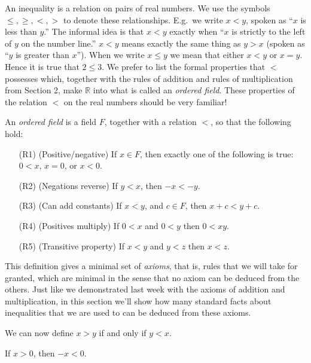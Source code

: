 \documentclass[11pt,dvipsnames]{book}
\numberwithin{figure}{section} %
\numberwithin{table}{section} %
\begin{document}
An inequality is a relation on pairs of real numbers.
We use the symbols $\leq,\geq,<,>$ to denote these relationships.
E.g.~we write $x < y$, spoken as ``$x$ is less than $y$.''
The informal idea is that $x<y$ exactly when ``$x$ is strictly to the left of $y$ on the number line.''
$x < y$ means exactly the same thing as $y > x$ (spoken as ``$y$ is greater than $x$'').
When we write $x \leq y$ we mean that either $x < y$ or $x=y$.
Hence it is true that $2 \leq 3$.
We prefer to list the formal properties that $<$ possesses which, together with the rules of addition and rules of multiplication from Section 2, make $\mathbb{R}$ into what is called an {\em ordered field}.
These properties of the relation $<$ on the real numbers should be very familiar!

\medskip
\begin{definition} An {\em ordered field} is a field $F$, together with a relation $<$, so that the following hold: %
\begin{enumerate}
\item[(R1)] (Positive/negative) If $x\in F$, then exactly one of the following is true: $0<x$, $x=0$, or $x<0$.
\item[(R2)] (Negations reverse) If $y<x$, then $-x<-y$.
\item[(R3)] (Can add constants) If $x<y$, and $c\in F$, then $x+c<y+c$.
\item[(R4)] (Positives multiply) If $0<x$ and $0<y$ then $0<xy$.
\item[(R5)] (Transitive property) If $x<y$ and $y<z$ then $x<z$.
\end{enumerate}
\end{definition}

This definition gives a minimal set of {\it axioms}, that is, rules that we will take for granted, which are minimal in the sense that no axiom can be deduced from the others. Just like we demonstrated last week with the axioms of addition and multiplication, in this section we'll show how many standard facts about inequalities that we are used to can be deduced from these axioms. %

We can now define \(x>y\) if and only if \(y<x\).

\begin{proposition}
If $x>0$, then $-x<0$.
\end{proposition}
\end{document}
